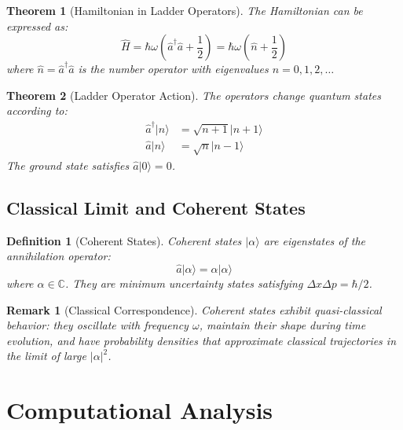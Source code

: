 \documentclass[a4paper, 11pt]{article}
\newtheorem{definition}{Definition}[section]
\newtheorem{theorem}{Theorem}[section]
\newtheorem{remark}{Remark}[section]
\begin{document}
\begin{theorem}[Hamiltonian in Ladder Operators]
The Hamiltonian can be expressed as:
\begin{equation}
\hat{H} = \hbar\omega\left(\hat{a}^\dagger\hat{a} + \frac{1}{2}\right) = \hbar\omega\left(\hat{n} + \frac{1}{2}\right)
\end{equation}
where $\hat{n} = \hat{a}^\dagger\hat{a}$ is the number operator with eigenvalues $n = 0, 1, 2, \ldots$
\end{theorem}

\begin{theorem}[Ladder Operator Action]
The operators change quantum states according to:
\begin{align}
\hat{a}^\dagger |n\rangle &= \sqrt{n+1} |n+1\rangle \\
\hat{a} |n\rangle &= \sqrt{n} |n-1\rangle
\end{align}
The ground state satisfies $\hat{a}|0\rangle = 0$.
\end{theorem}

\subsection{Classical Limit and Coherent States}

\begin{definition}[Coherent States]
Coherent states $|\alpha\rangle$ are eigenstates of the annihilation operator:
\begin{equation}
\hat{a}|\alpha\rangle = \alpha|\alpha\rangle
\end{equation}
where $\alpha \in \mathbb{C}$. They are minimum uncertainty states satisfying $\Delta x \Delta p = \hbar/2$.
\end{definition}

\begin{remark}[Classical Correspondence]
Coherent states exhibit quasi-classical behavior: they oscillate with frequency $\omega$,
maintain their shape during time evolution, and have probability densities that approximate
classical trajectories in the limit of large $|\alpha|^2$.
\end{remark}

\section{Computational Analysis}
\end{document}
